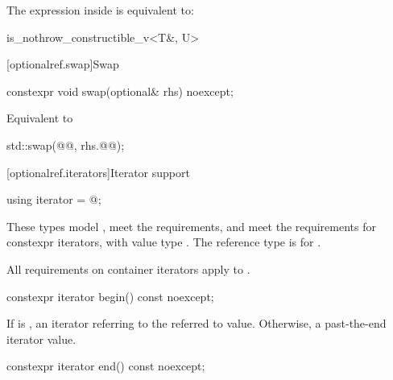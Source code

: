 \begin{addedblock}
\begin{itemdescr}
  \pnum
  \remarks
  The expression inside  is equivalent to:
  \begin{codeblock}
is_nothrow_constructible_v<T&, U>
  \end{codeblock}
\end{itemdescr}


[optionalref.swap]{Swap}

\begin{itemdecl}
constexpr void swap(optional& rhs) noexcept;
\end{itemdecl}

\begin{itemdescr}
  \pnum
  \effects
  Equivalent to
  \begin{codeblock}
std::swap(@@, rhs.@@);
  \end{codeblock}
\end{itemdescr}


[optionalref.iterators]{Iterator support}
\begin{itemdecl}
using iterator = @\impdef@;
\end{itemdecl}

\begin{itemdescr}
\pnum
These types
model ,
meet the  requirements, and
meet the requirements for constexpr iterators,
with value type .
The reference type is  for .

\pnum
All requirements on container iterators apply to
.

\end{itemdescr}


\begin{itemdecl}
constexpr iterator begin() const noexcept;
\end{itemdecl}

\begin{itemdescr}
  \pnum
  \returns
  If  is ,
  an iterator referring to the referred to value.
  Otherwise, a past-the-end iterator value.

\end{itemdescr}

\begin{itemdecl}
constexpr iterator end() const noexcept;
\end{itemdecl}


\end{addedblock}
